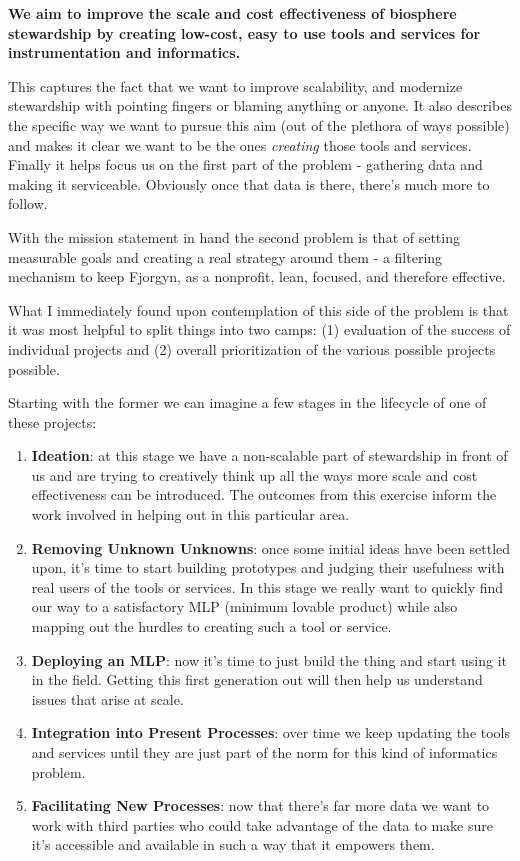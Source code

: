 \documentclass[10pt,a5paper]{book}
\begin{document}
\textbf{We aim to improve the scale and cost effectiveness of biosphere stewardship by creating low-cost, easy to use tools and services for instrumentation and informatics.} \linebreak

This captures the fact that we want to improve scalability, and modernize stewardship with pointing fingers or blaming anything or anyone. It also describes the specific way we want to pursue this aim (out of the plethora of ways possible) and makes it clear we want to be the ones \textit{creating} those tools and services. Finally it helps focus us on the first part of the problem - gathering data and making it serviceable. Obviously once that data is there, there's much more to follow.

With the mission statement in hand the second problem is that of setting measurable goals and creating a real strategy around them - a filtering mechanism to keep Fjorgyn, as a nonprofit, lean, focused, and therefore effective. 

What I immediately found upon contemplation of this side of the problem is that it was most helpful to split things into two camps: (1) evaluation of the success of individual projects and (2) overall prioritization of the various possible projects possible. 

Starting with the former we can imagine a few stages in the lifecycle of one of these projects:

\begin{enumerate}
\item \textbf{Ideation}: at this stage we have a non-scalable part of stewardship in front of us and are trying to creatively think up all the ways more scale and cost effectiveness can be introduced. The outcomes from this exercise inform the work involved in helping out in this particular area.
\item \textbf{Removing Unknown Unknowns}: once some initial ideas have been settled upon, it's time to start building prototypes and judging their usefulness with real users of the tools or services. In this stage we really want to quickly find our way to a satisfactory MLP (minimum lovable product) while also mapping out the hurdles to creating such a tool or service.
\item \textbf{Deploying an MLP}: now it's time to just build the thing and start using it in the field. Getting this first generation out will then help us understand issues that arise at scale.
\item \textbf{Integration into Present Processes}: over time we keep updating the tools and services until they are just part of the norm for this kind of informatics problem. 
\item \textbf{Facilitating New Processes}: now that there's far more data we want to work with third parties who could take advantage of the data to make sure it's accessible and available in such a way that it empowers them. 
\end{enumerate}
\end{document}
